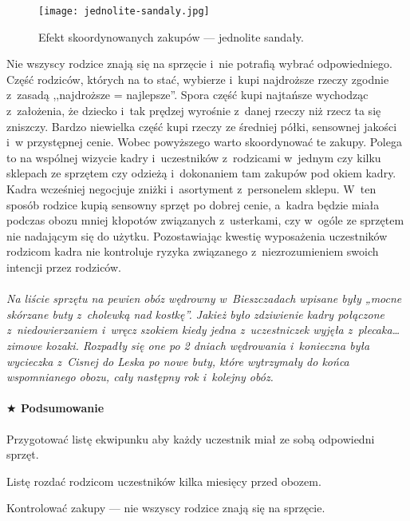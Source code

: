 \documentclass[a5paper,10pt,titlepage,twoside]{article}
\newcommand*{\thecheckbox}{\hss$\Box$} %
\newenvironment*{checklist}
{\list{}{%
\renewcommand*{\makelabel}[1]{\thecheckbox}}}
{\endlist}
\begin{document}
\begin{figure}[htp]
\centering
\texttt{[image: jednolite-sandaly.jpg]}
\caption{Efekt skoordynowanych zakupów --- jednolite sandały.}\label{fig:jednolite-sandaly}
\end{figure}
Nie wszyscy rodzice znają się na sprzęcie i~nie potrafią wybrać odpowiedniego. Część rodziców, których na to stać, wybierze i~kupi najdroższe rzeczy zgodnie z~zasadą ,,najdroższe = najlepsze''. Spora część kupi najtańsze wychodząc z~założenia, że dziecko i~tak prędzej wyrośnie z~danej rzeczy niż rzecz ta się zniszczy. Bardzo niewielka część kupi rzeczy ze średniej półki, sensownej jakości i~w przystępnej cenie. Wobec powyższego warto skoordynować te zakupy. Polega to na wspólnej wizycie kadry i~uczestników z~rodzicami w~jednym czy kilku sklepach ze sprzętem czy odzieżą i~dokonaniem tam zakupów pod okiem kadry. Kadra wcześniej negocjuje zniżki i~asortyment z~personelem sklepu. W~ten sposób rodzice kupią sensowny sprzęt po dobrej cenie, a~kadra będzie miała podczas obozu mniej kłopotów związanych z~usterkami, czy w~ogóle ze sprzętem nie nadającym się do użytku. Pozostawiając kwestię wyposażenia uczestników rodzicom kadra nie kontroluje ryzyka związanego z~niezrozumieniem swoich intencji przez rodziców.
\\
\\
\small{
\emph{Na liście sprzętu na pewien obóz wędrowny w~Bieszczadach wpisane były „mocne skórzane buty z~cholewką nad kostkę”. Jakież było zdziwienie kadry połączone z~niedowierzaniem i~wręcz szokiem kiedy jedna z~uczestniczek wyjęła z~plecaka\ldots zimowe kozaki. Rozpadły się one po 2 dniach wędrowania i~konieczna była wycieczka z~Cisnej do Leska po nowe buty, które wytrzymały do końca wspomnianego obozu, cały następny rok i~kolejny obóz.}}

\paragraph{$\bigstar$ Podsumowanie}
\begin{checklist}
\item Przygotować listę ekwipunku aby każdy uczestnik miał ze sobą odpowiedni sprzęt.
\item Listę rozdać rodzicom uczestników kilka miesięcy przed obozem.
\item Kontrolować zakupy --- nie wszyscy rodzice znają się na sprzęcie.
\end{checklist}
\end{document}
